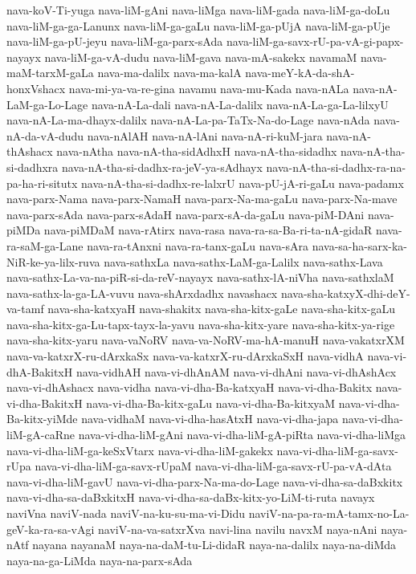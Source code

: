 {nava-koV-Ti-yuga
nava-liM-gAni
nava-liMga
nava-liM-gada
nava-liM-ga-doLu
nava-liM-ga-ga-Lanunx
nava-liM-ga-gaLu
nava-liM-ga-pUjA
nava-liM-ga-pUje
nava-liM-ga-pU-jeyu
nava-liM-ga-parx-sAda
nava-liM-ga-savx-rU-pa-vA-gi-papx-nayayx
nava-liM-ga-vA-dudu
nava-liM-gava
nava-mA-sakekx
navamaM
nava-maM-tarxM-gaLa
nava-ma-dalilx
nava-ma-kalA
nava-meY-kA-da-shA-honxVshacx
nava-mi-ya-va-re-gina
navamu
nava-mu-Kada
nava-nALa
nava-nA-LaM-ga-Lo-Lage
nava-nA-La-dali
nava-nA-La-dalilx
nava-nA-La-ga-La-lilxyU
nava-nA-La-ma-dhayx-dalilx
nava-nA-La-pa-TaTx-Na-do-Lage
nava-nAda
nava-nA-da-vA-dudu
nava-nAlAH
nava-nA-lAni
nava-nA-ri-kuM-jara
nava-nA-thAshacx
nava-nAtha
nava-nA-tha-sidAdhxH
nava-nA-tha-sidadhx
nava-nA-tha-si-dadhxra
nava-nA-tha-si-dadhx-ra-jeV-ya-sAdhayx
nava-nA-tha-si-dadhx-ra-na-pa-ha-ri-situtx
nava-nA-tha-si-dadhx-re-lalxrU
nava-pU-jA-ri-gaLu
nava-padamx
nava-parx-Nama
nava-parx-NamaH
nava-parx-Na-ma-gaLu
nava-parx-Na-mave
nava-parx-sAda
nava-parx-sAdaH
nava-parx-sA-da-gaLu
nava-piM-DAni
nava-piMDa
nava-piMDaM
nava-rAtirx
nava-rasa
nava-ra-sa-Ba-ri-ta-nA-gidaR
nava-ra-saM-ga-Lane
nava-ra-tAnxni
nava-ra-tanx-gaLu
nava-sAra
nava-sa-ha-sarx-ka-NiR-ke-ya-lilx-ruva
nava-sathxLa
nava-sathx-LaM-ga-Lalilx
nava-sathx-Lava
nava-sathx-La-va-na-piR-si-da-reV-nayayx
nava-sathx-lA-niVha
nava-sathxlaM
nava-sathx-la-ga-LA-vuvu
nava-shArxdadhx
navashacx
nava-sha-katxyX-dhi-deY-va-tamf
nava-sha-katxyaH
nava-shakitx
nava-sha-kitx-gaLe
nava-sha-kitx-gaLu
nava-sha-kitx-ga-Lu-tapx-tayx-la-yavu
nava-sha-kitx-yare
nava-sha-kitx-ya-rige
nava-sha-kitx-yaru
nava-vaNoRV
nava-va-NoRV-ma-hA-manuH
nava-vakatxrXM
nava-va-katxrX-ru-dArxkaSx
nava-va-katxrX-ru-dArxkaSxH
nava-vidhA
nava-vi-dhA-BakitxH
nava-vidhAH
nava-vi-dhAnAM
nava-vi-dhAni
nava-vi-dhAshAcx
nava-vi-dhAshacx
nava-vidha
nava-vi-dha-Ba-katxyaH
nava-vi-dha-Bakitx
nava-vi-dha-BakitxH
nava-vi-dha-Ba-kitx-gaLu
nava-vi-dha-Ba-kitxyaM
nava-vi-dha-Ba-kitx-yiMde
nava-vidhaM
nava-vi-dha-hasAtxH
nava-vi-dha-japa
nava-vi-dha-liM-gA-caRne
nava-vi-dha-liM-gAni
nava-vi-dha-liM-gA-piRta
nava-vi-dha-liMga
nava-vi-dha-liM-ga-keSxVtarx
nava-vi-dha-liM-gakekx
nava-vi-dha-liM-ga-savx-rUpa
nava-vi-dha-liM-ga-savx-rUpaM
nava-vi-dha-liM-ga-savx-rU-pa-vA-dAta
nava-vi-dha-liM-gavU
nava-vi-dha-parx-Na-ma-do-Lage
nava-vi-dha-sa-daBxkitx
nava-vi-dha-sa-daBxkitxH
nava-vi-dha-sa-daBx-kitx-yo-LiM-ti-ruta
navayx
naviVna
naviV-nada
naviV-na-ku-su-ma-vi-Didu
naviV-na-pa-ra-mA-tamx-no-La-geV-ka-ra-sa-vAgi
naviV-na-va-satxrXva
navi-lina
navilu
navxM
naya-nAni
naya-nAtf
nayana
nayanaM
naya-na-daM-tu-Li-didaR
naya-na-dalilx
naya-na-diMda
naya-na-ga-LiMda
naya-na-parx-sAda
}
